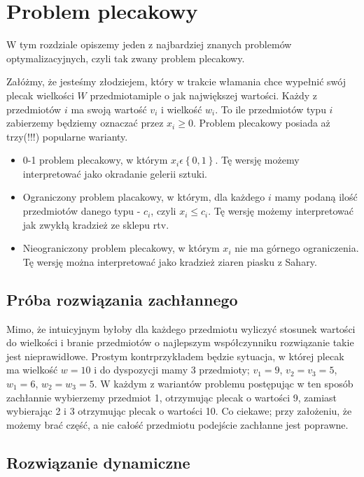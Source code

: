 \section{Problem plecakowy}

\label{sec:plecaki}

W tym rozdziale opiszemy jeden z najbardziej znanych problemów optymalizacyjnych, czyli tak zwany problem plecakowy.

Załóżmy, że jesteśmy złodziejem, który w trakcie włamania chce wypełnić swój plecak wielkości $W$ przedmiotamiple o jak największej wartości.
Każdy z przedmiotów $i$ ma swoją wartość $v_i$ i wielkość $w_i$.
To ile przedmiotów typu $i$ zabierzemy będziemy oznaczać przez $x_i \geq 0$.
Problem plecakowy posiada aż trzy(!!!) popularne warianty.


\begin{itemize}
  \item 0-1 problem plecakowy, w którym $x_i \epsilon \left \{ 0, 1 \right \}$.
  Tę wersję możemy interpretować jako okradanie gelerii sztuki.
  \item Ograniczony problem placakowy, w którym, dla każdego $i$ mamy podaną ilość przedmiotów danego typu - $c_i$, czyli $x_i \leq c_i$.
  Tę wersję możemy interpretować jak zwykłą kradzież ze sklepu rtv.
  \item Nieograniczony problem plecakowy, w którym $x_i$ nie ma górnego ograniczenia.
  Tę wersję można interpretować jako kradzież ziaren piasku z Sahary.
\end{itemize}

\subsection{Próba rozwiązania zachłannego}
Mimo, że intuicyjnym byłoby dla każdego przedmiotu wyliczyć stosunek wartości do wielkości i branie przedmiotów
o najlepszym współczynniku rozwiązanie takie jest nieprawidłowe.
Prostym kontrprzykładem będzie sytuacja, w której plecak ma wielkość $w = 10$ i do dyspozycji mamy 3 przedmioty;
$v_1=9$, $v_2=v_3=5$, $w_1=6$, $w_2=w_3=5$. W każdym z wariantów problemu postępując w ten sposób zachłannie wybierzemy przedmiot 1,
otrzymując plecak o wartości 9, zamiast wybierając 2 i 3 otrzymując plecak o wartości 10.
Co ciekawe; przy założeniu, że możemy brać część, a nie całość przedmiotu podejście zachłanne jest poprawne.

\subsection{Rozwiązanie dynamiczne}

